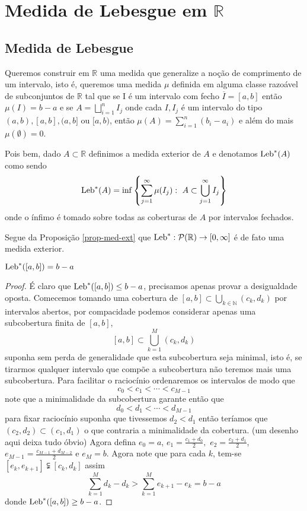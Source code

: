 \chapter[Aula 3]{Medida de Lebesgue em $\mathbb{R}$}
\chaptermark{}






\section*{Medida de Lebesgue}


Queremos construir em $\mathbb{R}$ uma medida que 
generalize a noção de comprimento de  
um intervalo, isto é, queremos uma medida  
$\mu$ definida em alguma classe razoável de 
subconjuntos de $\mathbb{R}$ tal que se I é um intervalo
com fecho $\overline{I}=[a,b]$ então $\mu(I)=b-a$ 
e se $A=\bigsqcup_{i=1}^nI_j$ onde cada $I,I_j$ 
é um intervalo do tipo $(a,b), [a,b],(a,b]$ ou $[a,b)$,  
então $\mu(A)=\sum_{i=1}^n(b_i-a_i)$ e
além do mais $\mu(\emptyset)=0$.



Pois bem, dado $A\subset \mathbb{R}$ 
definimos a medida exterior de $A$ e 
denotamos $\textnormal{Leb}^{*}(A)$ como sendo 
$$
\textnormal{Leb}^{*}(A)=\inf 
				\left\{
					\sum_{j=1}^\infty \mu(I_j):~ A\subset \bigcup_{j=1}^\infty I_j 
				\right\}
$$
onde o ínfimo é tomado sobre todas as coberturas de $A$ por intervalos fechados.  

Segue da Proposição \ref{prop-med-ext} que 
$\textnormal{Leb}^{*}:\mathcal{P}(\mathbb{R})\to[0,\infty]$ é de fato uma medida exterior.

\begin{lema}\label{LEB 2}
$\textnormal{Leb}^{*}([a,b])=b-a$
\end{lema}

\begin{proof}
É claro que $\textnormal{Leb}^{*}([a,b])\leq b-a$, precisamos apenas provar a desigualdade oposta. Comecemos tomando uma cobertura de $[a,b]\subset \bigcup_{k\in \mathbb{N}} (c_k,d_k)$  por intervalos abertos, por compacidade podemos considerar apenas uma subcobertura finita de $[a,b]$, 
$$
[a,b]\subset \bigcup_{k=1}^M(c_k,d_k)
$$
suponha sem perda de generalidade que esta subcobertura seja minimal, isto é, se tirarmos qualquer intervalo que compõe a subcobertura não teremos mais uma subcobertura. Para facilitar o raciocínio ordenaremos os intervalos de modo que 
$$
c_0<c_1<\cdots<c_{M-1}
$$
note que a minimalidade da subcobertura garante então que 
$$
d_0<d_1<\cdots<d_{M-1}
$$
para fixar raciocínio  suponha que tivessemos $d_2<d_1$ então teríamos que $(c_2,d_2)\subset (c_1,d_1)$ o que contraria a minimalidade da cobertura. ({\red um desenho aqui deixa tudo óbvio}) Agora defina $e_0=a$, $e_1=\frac{c_1+d_0}{2},$ $e_2=\frac{c_2+d_1}{2}$,
$e_{M-1}=\frac{c_{M-1}+d_{M-2}}{2}$ e $e_{M}=b.$  Agora note que  para cada $k$, tem-se $[e_k,e_{k+1}]\subsetneqq [c_k,d_k]$ assim 
$$
\sum_{k=1}^M d_k-d_k>\sum_{k=1}^M e_{k+1}-e_k=b-a
$$ 
donde $\textnormal{Leb}^{*}([a,b])\geq b-a$.

\end{proof}

